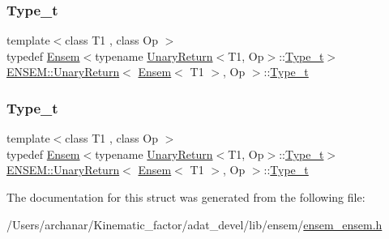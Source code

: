 \subsubsection{\texorpdfstring{Type\_t}{Type\_t}\hspace{0.1cm}{\footnotesize\ttfamily [1/2]}}
{\footnotesize\ttfamily template$<$class T1 , class Op $>$ \\
typedef \mbox{\hyperlink{classENSEM_1_1Ensem}{Ensem}}$<$typename \mbox{\hyperlink{structENSEM_1_1UnaryReturn}{Unary\+Return}}$<$T1, Op$>$\+::\mbox{\hyperlink{structENSEM_1_1UnaryReturn_3_01Ensem_3_01T1_01_4_00_01Op_01_4_a224980bb4b2ff570eb5fcf4036421962}{Type\+\_\+t}}$>$ \mbox{\hyperlink{structENSEM_1_1UnaryReturn}{E\+N\+S\+E\+M\+::\+Unary\+Return}}$<$ \mbox{\hyperlink{classENSEM_1_1Ensem}{Ensem}}$<$ T1 $>$, Op $>$\+::\mbox{\hyperlink{structENSEM_1_1UnaryReturn_3_01Ensem_3_01T1_01_4_00_01Op_01_4_a224980bb4b2ff570eb5fcf4036421962}{Type\+\_\+t}}}

\mbox{\label{structENSEM_1_1UnaryReturn_3_01Ensem_3_01T1_01_4_00_01Op_01_4_a224980bb4b2ff570eb5fcf4036421962}} 
\subsubsection{\texorpdfstring{Type\_t}{Type\_t}\hspace{0.1cm}{\footnotesize\ttfamily [2/2]}}
{\footnotesize\ttfamily template$<$class T1 , class Op $>$ \\
typedef \mbox{\hyperlink{classENSEM_1_1Ensem}{Ensem}}$<$typename \mbox{\hyperlink{structENSEM_1_1UnaryReturn}{Unary\+Return}}$<$T1, Op$>$\+::\mbox{\hyperlink{structENSEM_1_1UnaryReturn_3_01Ensem_3_01T1_01_4_00_01Op_01_4_a224980bb4b2ff570eb5fcf4036421962}{Type\+\_\+t}}$>$ \mbox{\hyperlink{structENSEM_1_1UnaryReturn}{E\+N\+S\+E\+M\+::\+Unary\+Return}}$<$ \mbox{\hyperlink{classENSEM_1_1Ensem}{Ensem}}$<$ T1 $>$, Op $>$\+::\mbox{\hyperlink{structENSEM_1_1UnaryReturn_3_01Ensem_3_01T1_01_4_00_01Op_01_4_a224980bb4b2ff570eb5fcf4036421962}{Type\+\_\+t}}}



The documentation for this struct was generated from the following file\+:\begin{DoxyCompactItemize}
\item 
/\+Users/archanar/\+Kinematic\+\_\+factor/adat\+\_\+devel/lib/ensem/\mbox{\hyperlink{lib_2ensem_2ensem__ensem_8h}{ensem\+\_\+ensem.\+h}}\end{DoxyCompactItemize}
